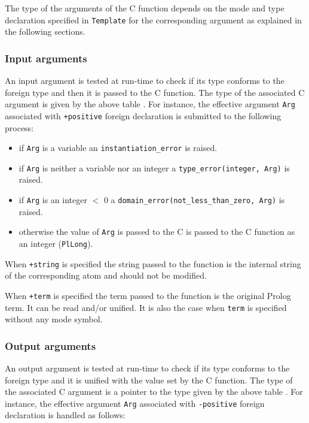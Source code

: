 The type of the arguments of the C function depends on the mode and type
declaration specified in \texttt{Template} for the corresponding argument as
explained in the following sections.

\subsubsection{Input arguments}
\label{Input-arguments}
An input argument is tested at run-time to check if its type conforms to the
foreign type and then it is passed to the C function. The type of the
associated C argument is given by the above table
. For instance, the effective argument
\texttt{Arg} associated with \texttt{+positive} foreign declaration is
submitted to the following process:

\begin{itemize}

\item if \texttt{Arg} is a variable an \texttt{instantiation\_error} is
raised.

\item if \texttt{Arg} is neither a variable nor an integer a
\texttt{type\_error(integer, Arg)} is raised.

\item if \texttt{Arg} is an integer $<$ 0 a
\texttt{domain\_error(not\_less\_than\_zero, Arg)} is raised.

\item otherwise the value of \texttt{Arg} is passed to the C is passed to
the C function as an integer (\texttt{PlLong}).

\end{itemize}

When \texttt{+string} is specified the string passed to the function is the
internal string of the corresponding atom and should not be modified.

When \texttt{+term} is specified the term passed to the function is the
original Prolog term. It can be read and/or unified. It is also the case
when \texttt{term} is specified without any mode symbol.

\subsubsection{Output arguments}
\label{Output-arguments}
An output argument is tested at run-time to check if its type conforms to
the foreign type and it is unified with the value set by the C function. The
type of the associated C argument is a pointer to the type given by the
above table . For instance, the effective
argument \texttt{Arg} associated with \texttt{-positive} foreign declaration
is handled as follows:

